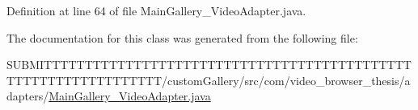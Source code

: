 Definition at line 64 of file Main\-Gallery\-\_\-\-Video\-Adapter.\-java.



The documentation for this class was generated from the following file\-:\begin{DoxyCompactItemize}
\item 
S\-U\-B\-M\-I\-T\-T\-T\-T\-T\-T\-T\-T\-T\-T\-T\-T\-T\-T\-T\-T\-T\-T\-T\-T\-T\-T\-T\-T\-T\-T\-T\-T\-T\-T\-T\-T\-T\-T\-T\-T\-T\-T\-T\-T\-T\-T\-T\-T\-T\-T\-T\-T\-T\-T\-T\-T\-T\-T\-T\-T\-T\-T\-T\-T\-T\-T\-T\-T/custom\-Gallery/src/com/video\-\_\-browser\-\_\-thesis/adapters/\hyperlink{_main_gallery___video_adapter_8java}{Main\-Gallery\-\_\-\-Video\-Adapter.\-java}\end{DoxyCompactItemize}
